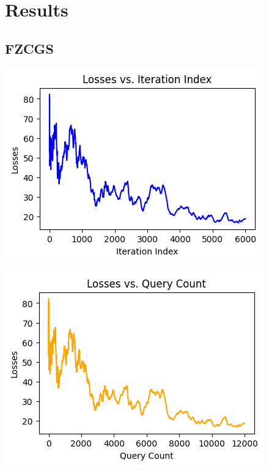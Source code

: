 \documentclass[10pt,twocolumn,letterpaper]{article}
\begin{document}
\section{Results}

\subsection{FZCGS}

\begin{center}
   \includegraphics*[scale=0.7]{img/RDSA_loss_vs_iterations.png}
\end{center}

\begin{center}
   \includegraphics*[scale=0.7]{img/RDSA_loss_vs_querycount.png}
\end{center}
\end{document}
